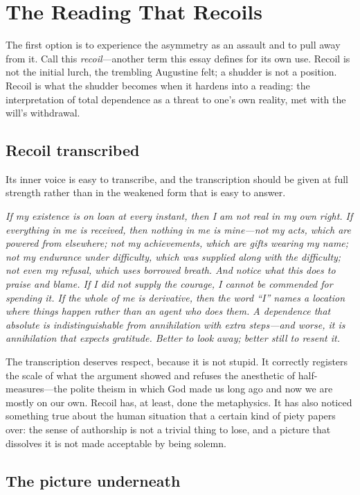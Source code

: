 \section{The Reading That Recoils}

The first option is to experience the asymmetry as an assault and to pull away from it. Call this \emph{recoil}---another term this essay defines for its own use. Recoil is not the initial lurch, the trembling Augustine felt; a shudder is not a position. Recoil is what the shudder becomes when it hardens into a reading: the interpretation of total dependence as a threat to one's own reality, met with the will's withdrawal.

\subsection{Recoil transcribed}

Its inner voice is easy to transcribe, and the transcription should be given at full strength rather than in the weakened form that is easy to answer.

\emph{If my existence is on loan at every instant, then I am not real in my own right. If everything in me is received, then nothing in me is mine---not my acts, which are powered from elsewhere; not my achievements, which are gifts wearing my name; not my endurance under difficulty, which was supplied along with the difficulty; not even my refusal, which uses borrowed breath. And notice what this does to praise and blame. If I did not supply the courage, I cannot be commended for spending it. If the whole of me is derivative, then the word ``I'' names a location where things happen rather than an agent who does them. A dependence that absolute is indistinguishable from annihilation with extra steps---and worse, it is annihilation that expects gratitude. Better to look away; better still to resent it.}

The transcription deserves respect, because it is not stupid. It correctly registers the scale of what the argument showed and refuses the anesthetic of half-measures---the polite theism in which God made us long ago and now we are mostly on our own. Recoil has, at least, done the metaphysics. It has also noticed something true about the human situation that a certain kind of piety papers over: the sense of authorship is not a trivial thing to lose, and a picture that dissolves it is not made acceptable by being solemn.

\subsection{The picture underneath}

